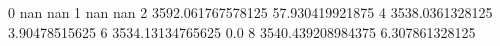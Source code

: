 0 nan nan
1 nan nan
2 3592.061767578125 57.930419921875
4 3538.0361328125 3.90478515625
6 3534.13134765625 0.0
8 3540.439208984375 6.307861328125
